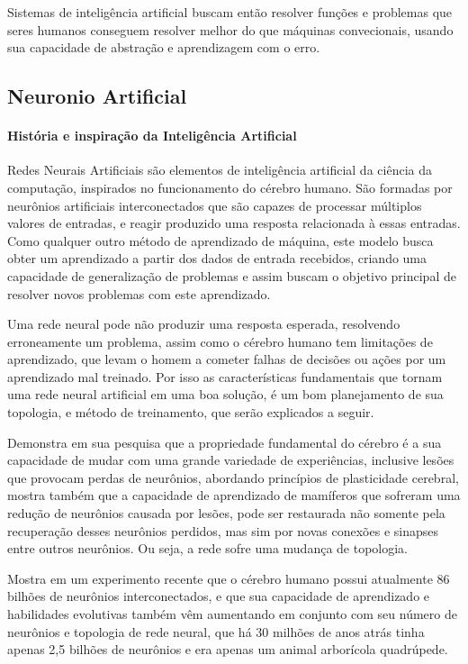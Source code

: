 \documentclass[	12pt, Times, openright, twoside, a4paper, english, brazil]{abntex2}
\begin{document}
          Sistemas de inteligência artificial buscam então resolver funções e problemas que seres humanos conseguem resolver melhor do que máquinas convecionais, usando sua capacidade de abstração e aprendizagem com o erro.

        \subsection{Neuronio Artificial}
         
          \paragraph*{História e inspiração da Inteligência Artificial}
            Redes Neurais Artificiais são elementos de inteligência artificial da ciência da computação, inspirados no funcionamento do cérebro humano.
            São formadas por neurônios artificiais interconectados que são capazes de processar múltiplos valores de entradas, e reagir produzido uma resposta relacionada à essas entradas.
            Como qualquer outro método de aprendizado de máquina, este modelo busca obter um aprendizado a partir dos dados de entrada recebidos, criando uma capacidade de generalização de problemas e assim buscam o objetivo principal de resolver novos problemas com este aprendizado.

            Uma rede neural pode não produzir uma resposta esperada, resolvendo erroneamente um problema, assim como o cérebro humano tem limitações de aprendizado, que levam o homem a cometer falhas de decisões ou ações por um aprendizado mal treinado. Por isso as características fundamentais que tornam uma rede neural artificial em uma boa solução, é um bom planejamento de sua topologia, e método de treinamento, que serão explicados a seguir.

            \cite{Muhammad2014} Demonstra em sua pesquisa que a propriedade fundamental do cérebro é a sua capacidade de mudar com uma grande variedade de experiências, inclusive lesões que provocam perdas de neurônios, abordando princípios de plasticidade cerebral, mostra também que a capacidade de aprendizado de mamíferos que sofreram uma redução de neurônios causada por lesões, pode ser restaurada não somente pela recuperação desses neurônios perdidos, mas sim por novas conexões e sinapses entre outros neurônios. Ou seja, a rede sofre uma mudança de topologia.

            \cite{Fapesp192} Mostra em um experimento recente que o cérebro humano possui atualmente 86 bilhões de neurônios interconectados, e que sua capacidade de aprendizado e habilidades evolutivas também vêm aumentando em conjunto com seu número de neurônios e topologia de rede neural, que há 30 milhões de anos atrás tinha apenas 2,5 bilhões de neurônios e era apenas um animal arborícola quadrúpede.
\end{document}
